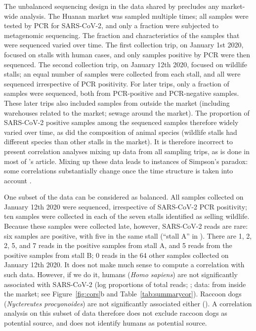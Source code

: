 \documentclass[11pt]{article}
\def \sct {\mbox{SARS-CoV-2}}
\begin{document}
The unbalanced sequencing design in the data shared by \citet[Extended Data Table~2]{Liu2023Nature} precludes any market-wide analysis. The Huanan market was sampled multiple times; all samples were tested by PCR for \sct{}, and only a fraction were subjected to metagenomic sequencing. The fraction and characteristics of the samples that were sequenced varied over time. The first collection trip, on January 1st 2020, focused on stalls with human cases, and only samples positive by PCR were then sequenced. The second collection trip, on January 12th 2020, focused on wildlife stalls; an equal number of samples were collected from each stall, and all were sequenced irrespective of PCR positivity. For later trips, only a fraction of samples were sequenced, both from PCR-positive and PCR-negative samples. These later trips also included samples from outside the market (including warehouses related to the market; sewage around the market). The proportion of \sct{} positive samples among the sequenced samples therefore widely varied over time, as did the composition of animal species (wildlife stalls had different species than other stalls in the market). It is therefore incorrect to present correlation analyses mixing up data from all sampling trips, as is done in most of \citet{Bloom2023VE}'s article. Mixing up these data leads to instances of Simpson's paradox: some correlations substantially change once the time structure is taken into account \citep[Figure~S4]{ACC2023bioRxiv}.

One subset of the data can be considered as balanced. All samples collected on January 12th 2020 were sequenced, irrespective of \sct{} PCR positivity; ten samples were collected in each of the seven stalls identified as selling wildlife. Because these samples were collected late, however, \sct{} reads are rare: six samples are positive, with five in the same stall (``stall A'' in \citet{ACC2023bioRxiv}). There are 1, 2, 2, 5, and 7 reads in the positive samples from stall A, and 5 reads from the positive samples from stall B; 0 reads in the 64 other samples collected on January 12th 2020. It does not make much sense to compute a correlation with such data. However, if we do it, humans (\textit{Homo sapiens}) are not significantly associated with \sct{} (log proportions of total reads; \JBTwelfthSCHS{}; data: \citet{Bloom2023VE} from inside the market; see Figure~\ref{fig:cors}b and Table~\ref{tab:summarycor}). Raccoon dogs (\textit{Nyctereutes procyonoides}) are not significantly associated either (\JBTwelfthSCRD{}). A correlation analysis on this subset of data therefore does not exclude raccoon dogs as potential source, and does not identify humans as potential source.
\end{document}

